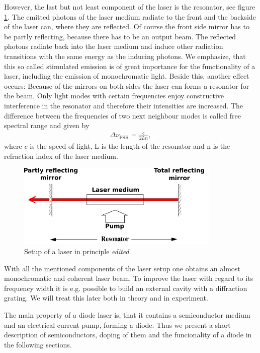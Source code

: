 However, the last but not least component of the laser is the resonator, see figure \ref{fig:lasersetup}.
The emitted photons of the laser medium radiate to the front and the backside of the laser can, where they are reflected. Of course the
front side mirror has to be partly reflecting, because there has to be an output beam. The reflected photons radiate back into the
laser medium and induce other radiation transitions with the same energy as the inducing photons. We emphasize, that this so called stimulated emission
is of great importance for the functionality of a laser, including the emission of monochromatic light. Beside this, another effect occurs:
Because of the mirrors on both sides the laser can forms a resonator for the beam. Only light modes with certain frequencies enjoy constructive interference
in the resonator and therefore their intensities are increased. The difference between the frequencies of two next neighbour modes is
called free spectral range and given by
\begin{align}
  \Delta \nu_\text{FSR} = \frac{\text{c}}{2 L n},
  \label{eqn:freespectralrange}
\end{align}
where $c$ is the speed of light, L is the length of the resonator and n is the refraction index of the laser medium.

\begin{figure}
  \centering
  \includegraphics[height = 4.0cm]{Ordnername/lasersetup_edit.pdf}
  \caption{Setup of a laser in principle \cite{manual2} \textit{edited}.}
  \label{fig:lasersetup}
\end{figure}

With all the mentioned components of the laser setup one obtains an almost monochromatic and coherent laser beam.
To improve the laser with regard to its frequency width it is e.g. possible to build an external cavity with a diffraction
grating. We will treat this later both in theory and in experiment.

The main property of a diode laser is, that it contains a semiconductor medium and an electrical current pump, forming a diode.
Thus we present a short description of semiconductors, doping of them and the funcionality of a diode in the following sections.

